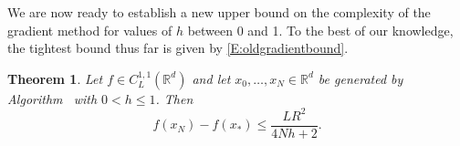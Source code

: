 \documentclass[12pt]{article}
\newcommand{\yoel}[1]{\textbf{\color{red}$\ll$#1$\gg$}}
\numberwithin{equation}{section}
\newtheorem{theorem}{Theorem}[section]
\theoremstyle{definition}
\theoremstyle{remark}
\newcommand{\gradalg}{\text{GM}\xspace}
\begin{document}
We are now ready to establish a new upper bound on the complexity of the gradient method for
values of $h$ between 0 and 1. To the best of our knowledge, the tightest bound thus far is
given by \eqref{E:oldgradientbound}.
\begin{theorem}\label{T:gradUpperBound}
Let $f\in C^{1,1}_L(\mathbb{R}^d)$ and let $x_0,\dots,x_N\in \mathbb{R}^d$ be generated by
Algorithm~\gradalg with $0< h \leq 1$. Then
\begin{equation}\label{E:gmbound}
    f(x_N)-f(x_\ast) \leq \frac{LR^2}{4 N h+2}.
\end{equation}
\end{theorem}
\end{document}
